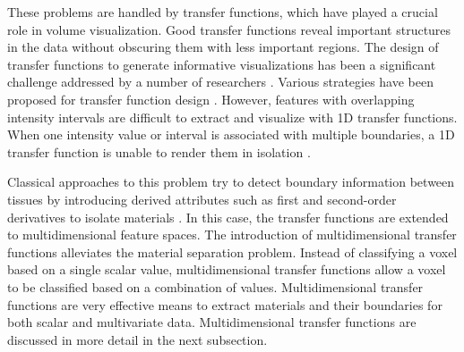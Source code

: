 \documentclass{egpubl}
\begin{document}
These problems are handled by transfer functions, which have played a crucial role in volume visualization.
Good transfer functions reveal important structures in the data without obscuring them with less important regions.
The design of transfer functions to generate informative visualizations has been a significant challenge addressed by a number of researchers \cite{pfister_transfer_2001}.
Various strategies have been proposed for transfer function design \cite{hadwiger_real-time_2006}.
However, features with overlapping intensity intervals are difficult to extract and visualize with 1D transfer functions.
When one intensity value or interval is associated with multiple boundaries, a 1D transfer function is unable to render them in isolation \cite{kniss_multidimensional_2002}.

Classical approaches to this problem try to detect boundary information between tissues by introducing derived attributes such as first and second-order derivatives to isolate materials \cite{kindlmann_semi-automatic_1998} \cite{kniss_multidimensional_2002}. In this case, the transfer functions are extended to multidimensional feature spaces. 
The introduction of multidimensional transfer functions alleviates the material separation problem.
Instead of classifying a voxel based on a single scalar value, multidimensional transfer functions allow a voxel to be classified based on a combination of values.
Multidimensional transfer functions are very effective means to extract materials and their boundaries for both scalar and multivariate data.
Multidimensional transfer functions are discussed in more detail in the next subsection.
\end{document}
